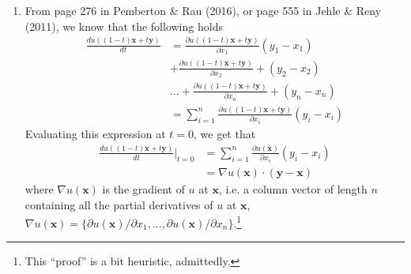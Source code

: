 \documentclass[a4paper,11pt,american]{article}
\newcommand{\xx}{\mathbf{x}}
\begin{document}
\begin{enumerate}[label = \alph*)]
    \item 
    From page 276 in Pemberton \& Rau (2016), or page 555 in Jehle \& Reny (2011), we know that the following holds
    \begin{align*}
    \frac{d u((1 - t) \xx + t \mathbf{y})}{d t} &= 
    \frac{\partial u((1 - t) \xx + t \mathbf{y})}{\partial x_1} (y_1 - x_1) \\
    &+ \frac{\partial u((1 - t) \xx + t \mathbf{y})}{\partial x_2} +  (y_2 - x_2) \\
    &... + \frac{\partial u((1 - t) \xx + t \mathbf{y})}{\partial x_n} +  (y_n - x_n) \\
    &= \sum^{n}_{i = 1} \frac{\partial u((1 - t) \xx + t \mathbf{y})}{\partial x_i} (y_i - x_i) 
    \end{align*}
    Evaluating this expression at $t = 0$, we get that
    \begin{align*}
    \frac{d u((1 - t) \xx + t \mathbf{y})}{d t} \Bigr\rvert_{t = 0} 
    &= \sum^{n}_{i = 1} \frac{\partial u(\xx)}{\partial x_i} (y_i - x_i) \\
    &= \nabla u(\xx) \cdot (\mathbf{y} - \xx)
    \end{align*}
    where $\nabla u(\xx)$ is the gradient of $u$ at $\xx$, i.e. a column vector of length $n$ containing all the partial derivatives of $u$ at $\xx$, $\nabla u(\xx) = \{\partial u(\xx) / \partial x_1, ..., \partial u(\xx) / \partial x_n\}$.\footnote{This \enquote{proof} is a bit heuristic, admittedly.}
\end{enumerate}
\end{document}
